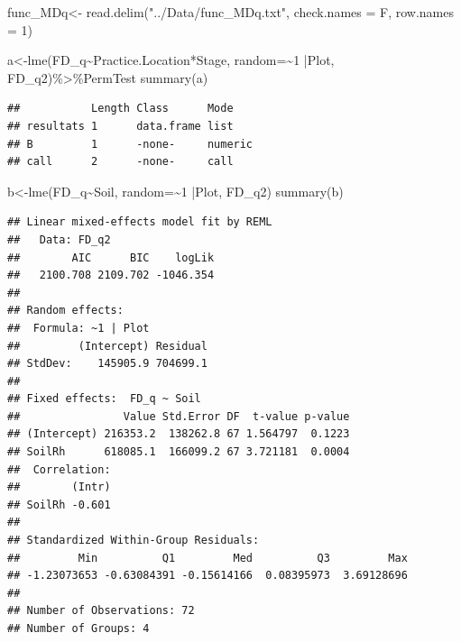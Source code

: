 \documentclass[]{interact}
\theoremstyle{plain}%
\theoremstyle{definition}
\theoremstyle{remark}
\newenvironment{Shaded}{\begin{snugshade}}{\end{snugshade}}
\newcommand{\AttributeTok}[1]{\textcolor[rgb]{0.77,0.63,0.00}{#1}}
\newcommand{\DecValTok}[1]{\textcolor[rgb]{0.00,0.00,0.81}{#1}}
\newcommand{\FunctionTok}[1]{\textcolor[rgb]{0.00,0.00,0.00}{#1}}
\newcommand{\NormalTok}[1]{#1}
\newcommand{\OtherTok}[1]{\textcolor[rgb]{0.56,0.35,0.01}{#1}}
\newcommand{\SpecialCharTok}[1]{\textcolor[rgb]{0.00,0.00,0.00}{#1}}
\newcommand{\StringTok}[1]{\textcolor[rgb]{0.31,0.60,0.02}{#1}}
\begin{document}
\begin{Shaded}
\begin{Highlighting}[]
\NormalTok{func\_MDq}\OtherTok{\textless{}{-}} \FunctionTok{read.delim}\NormalTok{(}\StringTok{"../Data/func\_MDq.txt"}\NormalTok{, }\AttributeTok{check.names =}\NormalTok{ F, }\AttributeTok{row.names =} \DecValTok{1}\NormalTok{)}
  
\NormalTok{a}\OtherTok{\textless{}{-}}\FunctionTok{lme}\NormalTok{(FD\_q}\SpecialCharTok{\textasciitilde{}}\NormalTok{Practice.Location}\SpecialCharTok{*}\NormalTok{Stage, }\AttributeTok{random=}\SpecialCharTok{\textasciitilde{}}\DecValTok{1} \SpecialCharTok{|}\NormalTok{Plot, FD\_q2)}\SpecialCharTok{\%\textgreater{}\%}\NormalTok{PermTest}
\FunctionTok{summary}\NormalTok{(a)}
\end{Highlighting}
\end{Shaded}

\begin{verbatim}
##           Length Class      Mode   
## resultats 1      data.frame list   
## B         1      -none-     numeric
## call      2      -none-     call
\end{verbatim}

\begin{Shaded}
\begin{Highlighting}[]
\NormalTok{b}\OtherTok{\textless{}{-}}\FunctionTok{lme}\NormalTok{(FD\_q}\SpecialCharTok{\textasciitilde{}}\NormalTok{Soil, }\AttributeTok{random=}\SpecialCharTok{\textasciitilde{}}\DecValTok{1} \SpecialCharTok{|}\NormalTok{Plot, FD\_q2)}
\FunctionTok{summary}\NormalTok{(b)}
\end{Highlighting}
\end{Shaded}

\begin{verbatim}
## Linear mixed-effects model fit by REML
##   Data: FD_q2 
##        AIC      BIC    logLik
##   2100.708 2109.702 -1046.354
## 
## Random effects:
##  Formula: ~1 | Plot
##         (Intercept) Residual
## StdDev:    145905.9 704699.1
## 
## Fixed effects:  FD_q ~ Soil 
##                Value Std.Error DF  t-value p-value
## (Intercept) 216353.2  138262.8 67 1.564797  0.1223
## SoilRh      618085.1  166099.2 67 3.721181  0.0004
##  Correlation: 
##        (Intr)
## SoilRh -0.601
## 
## Standardized Within-Group Residuals:
##         Min          Q1         Med          Q3         Max 
## -1.23073653 -0.63084391 -0.15614166  0.08395973  3.69128696 
## 
## Number of Observations: 72
## Number of Groups: 4
\end{verbatim}
\end{document}
